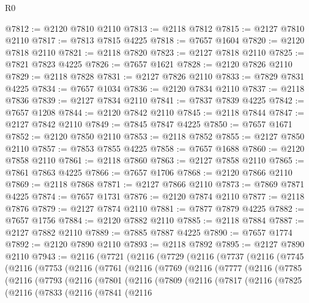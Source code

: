 \begin{lexlean}{R0}
\begin{coremodule}
@7812 := @2120 @7810 @2110
@7813 := @2118 @7812
@7815 := @2127 @7810 @2110
@7817 := @7813 @7815 @4225
@7818 := @7657 @1604
@7820 := @2120 @7818 @2110
@7821 := @2118 @7820
@7823 := @2127 @7818 @2110
@7825 := @7821 @7823 @4225
@7826 := @7657 @1621
@7828 := @2120 @7826 @2110
@7829 := @2118 @7828
@7831 := @2127 @7826 @2110
@7833 := @7829 @7831 @4225
@7834 := @7657 @1034
@7836 := @2120 @7834 @2110
@7837 := @2118 @7836
@7839 := @2127 @7834 @2110
@7841 := @7837 @7839 @4225
@7842 := @7657 @1208
@7844 := @2120 @7842 @2110
@7845 := @2118 @7844
@7847 := @2127 @7842 @2110
@7849 := @7845 @7847 @4225
@7850 := @7657 @1671
@7852 := @2120 @7850 @2110
@7853 := @2118 @7852
@7855 := @2127 @7850 @2110
@7857 := @7853 @7855 @4225
@7858 := @7657 @1688
@7860 := @2120 @7858 @2110
@7861 := @2118 @7860
@7863 := @2127 @7858 @2110
@7865 := @7861 @7863 @4225
@7866 := @7657 @1706
@7868 := @2120 @7866 @2110
@7869 := @2118 @7868
@7871 := @2127 @7866 @2110
@7873 := @7869 @7871 @4225
@7874 := @7657 @1731
@7876 := @2120 @7874 @2110
@7877 := @2118 @7876
@7879 := @2127 @7874 @2110
@7881 := @7877 @7879 @4225
@7882 := @7657 @1756
@7884 := @2120 @7882 @2110
@7885 := @2118 @7884
@7887 := @2127 @7882 @2110
@7889 := @7885 @7887 @4225
@7890 := @7657 @1774
@7892 := @2120 @7890 @2110
@7893 := @2118 @7892
@7895 := @2127 @7890 @2110
@7943 := @2116
    (@7721
      (@2116
        (@7729
          (@2116
            (@7737
              (@2116
                (@7745
                  (@2116
                    (@7753
                      (@2116
                        (@7761
                          (@2116
                            (@7769
                              (@2116
                                (@7777
                                  (@2116
                                    (@7785
                                      (@2116
                                        (@7793
                                          (@2116
                                            (@7801
                                              (@2116
                                                (@7809
                                                  (@2116
                                                    (@7817
                                                      (@2116
                                                        (@7825
                                                          (@2116
                                                            (@7833
                                                              (@2116
                                                                (@7841
                                                                  (@2116

\end{coremodule}
\end{lexlean}

